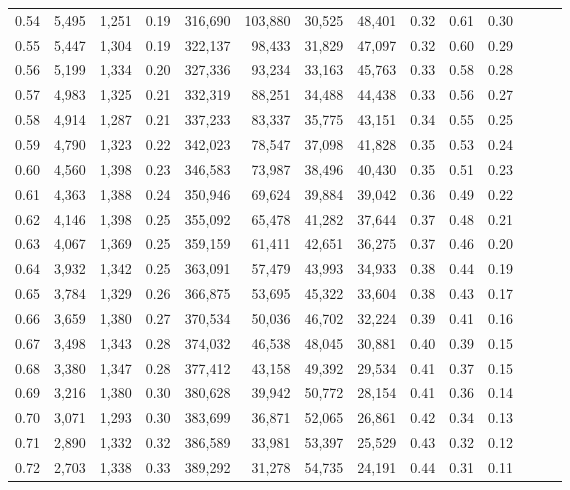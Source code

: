 \begin{tabular}{rrrrrrrrrrrrrr}
0.54 &  5,495 &  1,251 &  0.19 &  316,690 &  103,880 &  30,525 &  48,401 &  0.32 &  0.61 &      0.30 \\
0.55 &  5,447 &  1,304 &  0.19 &  322,137 &   98,433 &  31,829 &  47,097 &  0.32 &  0.60 &      0.29 \\
0.56 &  5,199 &  1,334 &  0.20 &  327,336 &   93,234 &  33,163 &  45,763 &  0.33 &  0.58 &      0.28 \\
0.57 &  4,983 &  1,325 &  0.21 &  332,319 &   88,251 &  34,488 &  44,438 &  0.33 &  0.56 &      0.27 \\
0.58 &  4,914 &  1,287 &  0.21 &  337,233 &   83,337 &  35,775 &  43,151 &  0.34 &  0.55 &      0.25 \\
0.59 &  4,790 &  1,323 &  0.22 &  342,023 &   78,547 &  37,098 &  41,828 &  0.35 &  0.53 &      0.24 \\
0.60 &  4,560 &  1,398 &  0.23 &  346,583 &   73,987 &  38,496 &  40,430 &  0.35 &  0.51 &      0.23 \\
0.61 &  4,363 &  1,388 &  0.24 &  350,946 &   69,624 &  39,884 &  39,042 &  0.36 &  0.49 &      0.22 \\
0.62 &  4,146 &  1,398 &  0.25 &  355,092 &   65,478 &  41,282 &  37,644 &  0.37 &  0.48 &      0.21 \\
0.63 &  4,067 &  1,369 &  0.25 &  359,159 &   61,411 &  42,651 &  36,275 &  0.37 &  0.46 &      0.20 \\
0.64 &  3,932 &  1,342 &  0.25 &  363,091 &   57,479 &  43,993 &  34,933 &  0.38 &  0.44 &      0.19 \\
0.65 &  3,784 &  1,329 &  0.26 &  366,875 &   53,695 &  45,322 &  33,604 &  0.38 &  0.43 &      0.17 \\
0.66 &  3,659 &  1,380 &  0.27 &  370,534 &   50,036 &  46,702 &  32,224 &  0.39 &  0.41 &      0.16 \\
0.67 &  3,498 &  1,343 &  0.28 &  374,032 &   46,538 &  48,045 &  30,881 &  0.40 &  0.39 &      0.15 \\
0.68 &  3,380 &  1,347 &  0.28 &  377,412 &   43,158 &  49,392 &  29,534 &  0.41 &  0.37 &      0.15 \\
0.69 &  3,216 &  1,380 &  0.30 &  380,628 &   39,942 &  50,772 &  28,154 &  0.41 &  0.36 &      0.14 \\
0.70 &  3,071 &  1,293 &  0.30 &  383,699 &   36,871 &  52,065 &  26,861 &  0.42 &  0.34 &      0.13 \\
0.71 &  2,890 &  1,332 &  0.32 &  386,589 &   33,981 &  53,397 &  25,529 &  0.43 &  0.32 &      0.12 \\
0.72 &  2,703 &  1,338 &  0.33 &  389,292 &   31,278 &  54,735 &  24,191 &  0.44 &  0.31 &      0.11 \\

\end{tabular}
